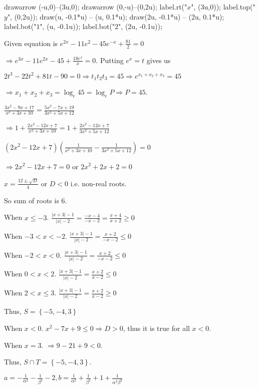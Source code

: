      drawarrow (-u,0)--(3u,0);
      drawarrow (0,-u)--(0,2u);
      label.rt("$x$", (3u,0));
      label.top("$y$", (0,2u));
      draw(u, -0.1*u) -- (u, 0.1*u);
      draw(2u, -0.1*u) -- (2u, 0.1*u);
      label.bot("$1$", (u, -0.1u));
      label.bot("$2$", (2u, -0.1u));
    \stopMPcode
  \stopplacefigure
\item Given equation is $e^{2x} - 11e^2 - 45e^{-x} + \frac{81}{2} = 0$

  $\Rightarrow e^{3x} - 11e^{2x} - 45 + \frac{18e^x}{x} = 0$. Putting $e^x = t$ gives us

  $2t^3 - 22t^2 + 81t - 90 = 0\Rightarrow t_1t_2t_3 = 45\Rightarrow e^{x_1 + x_2 + x_3} = 45$

  $\Rightarrow x_1 + x_2 + x_3 = \log_e45 = \log_eP \Rightarrow P = 45$.
\item $\frac{3x^2 - 9x + 17}{x^2 + 3x + 10} = \frac{5x^2 - 7x + 19}{3x^2 + 5x + 12}$

  $\Rightarrow 1 + \frac{2x^2 - 12x + 7}{x^2 + 3x + 10} = 1 + \frac{2x^2 - 12x + 7}{3x^2 + 5x + 12}$

  $(2x^2 - 12x + 7)\left(\frac{1}{x^2 + 3x + 10} - \frac{1}{3x^2 + 5x + 12}\right) = 0$

  $\Rightarrow 2x^2 - 12x + 7 = 0$ or $2x^2 + 2x + 2 = 0$

  $x = \frac{12\pm\sqrt{D}}{4}$ or $D < 0$ i.e. non-real roots.

  So sum of roots is $6$.
\item When $x \leq -3$. $\frac{|x + 3| - 1}{|x| - 2} = \frac{-x - 4}{-x - 2} = \frac{x + 4}{x + 2}\geq 0$

  When $-3 < x < -2$. $\frac{|x + 3| - 1}{|x| - 2} = \frac{x + 2}{-x -2} \leq 0$

  When $-2 < x < 0$. $\frac{|x + 3| - 1}{|x| - 2} = \frac{x + 2}{-x - 2}\leq 0$

  When $0 < x < 2$. $\frac{|x + 3| - 1}{|x| - 2} = \frac{x + 2}{x - 2} \leq 0$

  When $2 < x \leq 3$. $\frac{|x + 3| - 1}{|x| - 2} = \frac{x + 2}{x - 2} \geq 0$

  Thus, $S = \left\{-5, -4, 3\right\}$

  When $x < 0$. $x^2 - 7x + 9 \leq 0\Rightarrow D > 0$, thus it is true for all $x < 0$.

  When $x = 3$. $\Rightarrow 9 - 21 + 9 < 0$.

  Thus, $S\cap T = \left\{-5, -4, 3\right\}$.
\item $a = -\frac{1}{\alpha^2} - \frac{1}{\beta^2} - 2, b = \frac{1}{\alpha^2} + \frac{1}{\beta^2} + 1 +
  \frac{1}{\alpha^2\beta^2}$

